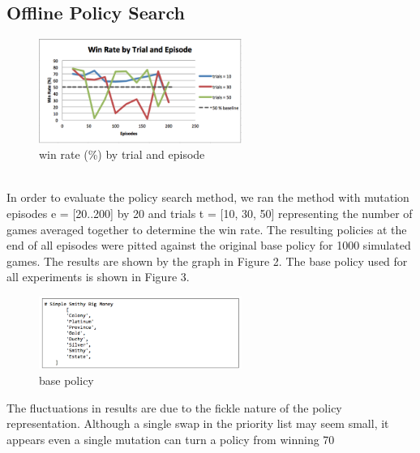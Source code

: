 \documentclass{article}
\begin{document}
\subsection{Offline Policy Search}
\begin{figure}[h]
  \includegraphics[width=250]{search.png}
  \caption{win rate (\%) by trial and episode}
\end{figure}
\\
In order to evaluate the policy search method, we ran the method with mutation episodes e = [20..200] by 20 and trials t = [10, 30, 50] representing the number of games averaged together to determine the win rate. The resulting policies at the end of all episodes were pitted against the original base policy for 1000 simulated games. The results are shown by the graph in Figure 2. The base policy used for all experiments is shown in Figure 3.
\begin{figure}[h]
  \includegraphics[width=250]{policy.png}
  \caption{base policy}
\end{figure}
The fluctuations in results are due to the fickle nature of the policy representation. Although a single swap in the priority list may seem small, it appears even a single mutation can turn a policy from winning 70%
\end{document}
